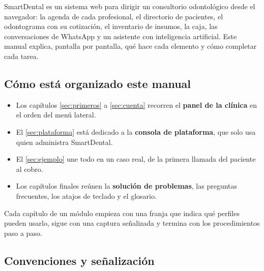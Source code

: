 \documentclass[11pt]{article}
\begin{document}
\sdportada

\setcounter{page}{2}
{\hypersetup{linkcolor=sdink}\tableofcontents}
\clearpage
{}

\label{sec:antes}

SmartDental es un sistema web para dirigir un consultorio odontológico desde el navegador: la agenda de cada profesional, el directorio de pacientes, el odontograma con su cotización, el inventario de insumos, la caja, las conversaciones de WhatsApp y un asistente con inteligencia artificial. Este manual explica, pantalla por pantalla, qué hace cada elemento y cómo completar cada tarea.

\subsection{Cómo está organizado este manual}

\begin{itemize}
  \item Los capítulos \ref{sec:primeros} a \ref{sec:cuenta} recorren el \textbf{panel de la clínica} en el orden del menú lateral.
  \item El \cref{sec:plataforma} está dedicado a la \textbf{consola de plataforma}, que solo usa quien administra SmartDental.
  \item El \cref{sec:ejemplo} une todo en un caso real, de la primera llamada del paciente al cobro.
  \item Los capítulos finales reúnen la \textbf{solución de problemas}, las preguntas frecuentes, los atajos de teclado y el glosario.
\end{itemize}

Cada capítulo de un módulo empieza con una franja que indica qué perfiles pueden usarlo, sigue con una captura señalizada y termina con los procedimientos paso a paso.

\subsection{Convenciones y señalización}\label{sec:convenciones}
\end{document}
